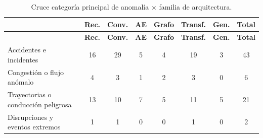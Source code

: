 \begingroup
\small
\begin{xltabular}{\linewidth}{Xccccccc}
\caption{Cruce categor\'{i}a principal de anomal\'{i}a $\times$ familia de arquitectura.}\label{tab:cruce_anomalia}\\
\toprule
\textbf{} & \textbf{Rec.} & \textbf{Conv.} & \textbf{AE} & \textbf{Grafo} & \textbf{Transf.} & \textbf{Gen.} & \textbf{Total} \\
\midrule\endfirsthead
\toprule
\textbf{} & \textbf{Rec.} & \textbf{Conv.} & \textbf{AE} & \textbf{Grafo} & \textbf{Transf.} & \textbf{Gen.} & \textbf{Total} \\
\midrule\endhead
\bottomrule\endfoot
Accidentes e incidentes & 16 & 29 & 5 & 4 & 19 & 3 & 43 \\
Congesti\'{o}n o flujo an\'{o}malo & 4 & 3 & 1 & 2 & 3 & 0 & 6 \\
Trayectorias o conducci\'{o}n peligrosa & 13 & 10 & 7 & 5 & 11 & 5 & 21 \\
Disrupciones y eventos extremos & 1 & 1 & 0 & 0 & 1 & 0 & 2 \\
\end{xltabular}
\endgroup
